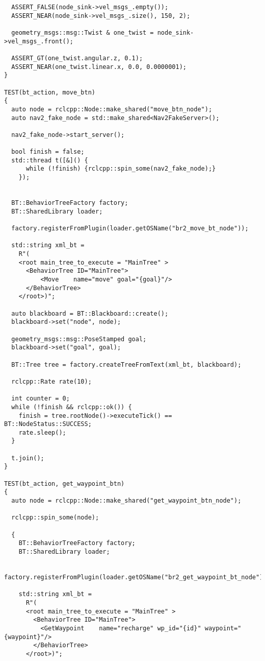 \begin{tcolorbox}[sharp corners, colframe=gray!80, colback=LightGray, left=0pt, top=0pt, bottom=0pt, title=\texttt{br2\_bt\_patrolling/tests/bt\_action\_test.cpp}]
\begin{verbatim}
  ASSERT_FALSE(node_sink->vel_msgs_.empty());
  ASSERT_NEAR(node_sink->vel_msgs_.size(), 150, 2);

  geometry_msgs::msg::Twist & one_twist = node_sink->vel_msgs_.front();

  ASSERT_GT(one_twist.angular.z, 0.1);
  ASSERT_NEAR(one_twist.linear.x, 0.0, 0.0000001);
}

TEST(bt_action, move_btn)
{
  auto node = rclcpp::Node::make_shared("move_btn_node");
  auto nav2_fake_node = std::make_shared<Nav2FakeServer>();

  nav2_fake_node->start_server();

  bool finish = false;
  std::thread t([&]() {
      while (!finish) {rclcpp::spin_some(nav2_fake_node);}
    });


  BT::BehaviorTreeFactory factory;
  BT::SharedLibrary loader;

  factory.registerFromPlugin(loader.getOSName("br2_move_bt_node"));

  std::string xml_bt =
    R"(
    <root main_tree_to_execute = "MainTree" >
      <BehaviorTree ID="MainTree">
          <Move    name="move" goal="{goal}"/>
      </BehaviorTree>
    </root>)";

  auto blackboard = BT::Blackboard::create();
  blackboard->set("node", node);

  geometry_msgs::msg::PoseStamped goal;
  blackboard->set("goal", goal);

  BT::Tree tree = factory.createTreeFromText(xml_bt, blackboard);

  rclcpp::Rate rate(10);

  int counter = 0;
  while (!finish && rclcpp::ok()) {
    finish = tree.rootNode()->executeTick() == BT::NodeStatus::SUCCESS;
    rate.sleep();
  }

  t.join();
}

TEST(bt_action, get_waypoint_btn)
{
  auto node = rclcpp::Node::make_shared("get_waypoint_btn_node");

  rclcpp::spin_some(node);

  {
    BT::BehaviorTreeFactory factory;
    BT::SharedLibrary loader;

    factory.registerFromPlugin(loader.getOSName("br2_get_waypoint_bt_node"));

    std::string xml_bt =
      R"(
      <root main_tree_to_execute = "MainTree" >
        <BehaviorTree ID="MainTree">
          <GetWaypoint    name="recharge" wp_id="{id}" waypoint="{waypoint}"/>
        </BehaviorTree>
      </root>)";


\end{verbatim}
\end{tcolorbox}
